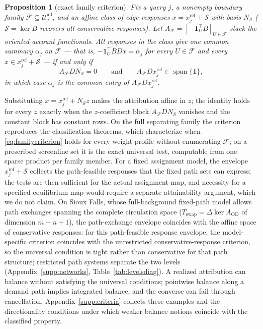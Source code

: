 \documentclass[a4paper,fleqn]{cas-sc}
\newtheorem{proposition}[theorem]{Proposition}
\begin{document}
\begin{proposition}[exact family criterion]\label{prop:familycriterion}
Fix a query $j$, a nonempty boundary family
$\mathcal F\subseteq\mathcal U_j^{\mathrm{all}}$, and an affine class of
edge responses $x=x_j^{\mathrm{ref}}+\mathcal S$ with basis $N_{\mathcal S}$
($\mathcal S=\ker B$ recovers all conservative responses). Let
$A_{\mathcal F}=[-\mathbf 1_U^\top B]_{U\in\mathcal F}$ stack the oriented
account functionals. All responses in the class give one common summary
$\alpha_j$ on $\mathcal F$ --- that is,
$-\mathbf 1_U^\top BDx=\alpha_j$ for every $U\in\mathcal F$ and every
$x\in x_j^{\mathrm{ref}}+\mathcal S$ --- if and only if
\begin{equation}
A_{\mathcal F}DN_{\mathcal S}=0
\qquad\text{and}\qquad
A_{\mathcal F}Dx_j^{\mathrm{ref}}\in\operatorname{span}\{\mathbf 1\},
\label{eq:familycriterion}
\end{equation}
in which case $\alpha_j$ is the common entry of $A_{\mathcal F}Dx_j^{\mathrm{ref}}$.
\end{proposition}
Substituting $x=x_j^{\mathrm{ref}}+N_{\mathcal S}z$ makes the attribution
affine in $z$; the identity holds for every $z$ exactly when the
$z$-coefficient block $A_{\mathcal F}DN_{\mathcal S}$ vanishes and the
constant block has constant rows. On the full separating family the
criterion reproduces the classification theorems, which characterize
when \eqref{eq:familycriterion} holds for every weight profile without
enumerating $\mathcal F$; on a prescribed screenline set it is the exact
universal test, computable from one sparse product per family member.
For a fixed assignment model, the envelope
$x_j^{\mathrm{ref}}+\mathcal S$ collects the path-feasible responses
that the fixed path sets can express; the tests are then sufficient
for the actual assignment map, and necessity for a specified
equilibrium map would require a separate attainability argument, which
we do not claim. On Sioux Falls, whose full-background fixed-path
model allows path exchanges spanning the complete circulation space
($T_{\mathrm{swap}}=\Delta\ker A_{\mathrm{OD}}$ of dimension $m-n+1$),
the path-exchange envelope coincides with the affine space of
conservative responses: for this path-feasible response envelope, the
model-specific criterion coincides with the unrestricted
conservative-response criterion, so the universal condition is tight
rather than conservative for that path structure; restricted path
systems separate the two levels (Appendix~\ref{supp:networks},
Table~\ref{tab:levelsdiag}).
A realized attribution can balance without satisfying the universal
conditions; pointwise balance along a demand path implies integrated
balance, and the converse can fail through cancellation.
Appendix~\ref{supp:criteria} collects these examples and the
directionality conditions under which weaker balance notions coincide
with the classified property.
\end{document}
